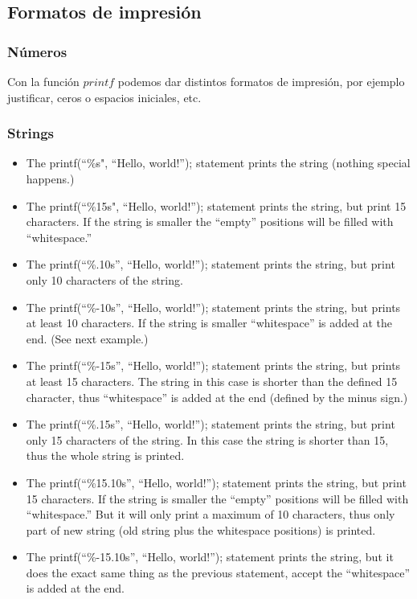 \documentclass[10pt,letterpaper,twocolumn]{article}
\newcommand{\source}[1]{
  
  \dotfill
}
\begin{document}
  \subsection{Formatos de impresión}
    \subsubsection{Números}
    Con la función $printf$ podemos dar distintos formatos de impresión, por ejemplo justificar, ceros o espacios iniciales, etc.
      \source{./src/printFormat.cpp}
    \subsubsection{Strings}
    \begin{itemize}
      \item The printf(“\%s", “Hello, world!”); statement prints the string (nothing special happens.)
      \item The printf(“\%15s", “Hello, world!”); statement prints the string, but print 15 characters. If the string is smaller the “empty” positions will be filled with “whitespace.”
      \item The printf(“\%.10s”, “Hello, world!”); statement prints the string, but print only 10 characters of the string.
      \item The printf(“\%-10s”, “Hello, world!”); statement prints the string, but prints at least 10 characters. If the string is smaller “whitespace” is added at the end. (See next example.)
      \item The printf(“\%-15s”, “Hello, world!”); statement prints the string, but prints at least 15 characters. The string in this case is shorter than the defined 15 character, thus “whitespace” is added at the end (defined by the minus sign.)
      \item The printf(“\%.15s”, “Hello, world!”); statement prints the string, but print only 15 characters of the string. In this case the string is shorter than 15, thus the whole string is printed.
      \item The printf(“\%15.10s”, “Hello, world!”); statement prints the string, but print 15 characters.
If the string is smaller the “empty” positions will be filled with “whitespace.” But it will only print a maximum of 10 characters, thus only part of new string (old string plus the whitespace positions) is printed.
      \item The printf(“\%-15.10s”, “Hello, world!”); statement prints the string, but it does the exact same thing as the previous statement, accept the “whitespace” is added at the end.
    \end{itemize}
\end{document}
